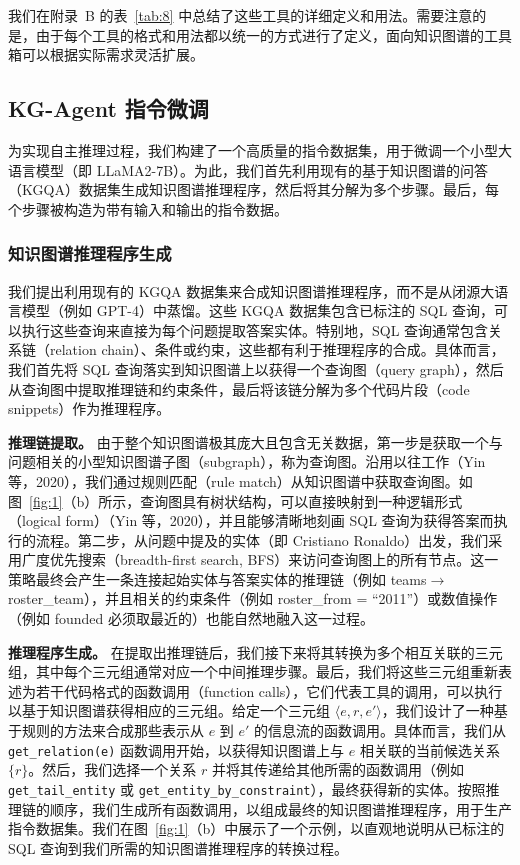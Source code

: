 \documentclass[11pt,UTF8,fontset=fandol]{ctexart}
\begin{document}
我们在附录~B 的表~\ref{tab:8} 中总结了这些工具的详细定义和用法。需要注意的是，由于每个工具的格式和用法都以统一的方式进行了定义，面向知识图谱的工具箱可以根据实际需求灵活扩展。

\subsection{KG-Agent 指令微调}

为实现自主推理过程，我们构建了一个高质量的指令数据集，用于微调一个小型大语言模型（即 LLaMA2-7B）。为此，我们首先利用现有的基于知识图谱的问答（KGQA）数据集生成知识图谱推理程序，然后将其分解为多个步骤。最后，每个步骤被构造为带有输入和输出的指令数据。

\subsubsection{知识图谱推理程序生成}

我们提出利用现有的 KGQA 数据集来合成知识图谱推理程序，而不是从闭源大语言模型（例如 GPT-4）中蒸馏。这些 KGQA 数据集包含已标注的 SQL 查询，可以执行这些查询来直接为每个问题提取答案实体。特别地，SQL 查询通常包含关系链（relation chain）、条件或约束，这些都有利于推理程序的合成。具体而言，我们首先将 SQL 查询落实到知识图谱上以获得一个查询图（query graph），然后从查询图中提取推理链和约束条件，最后将该链分解为多个代码片段（code snippets）作为推理程序。

\textbf{推理链提取。}
由于整个知识图谱极其庞大且包含无关数据，第一步是获取一个与问题相关的小型知识图谱子图（subgraph），称为查询图。沿用以往工作（Yin 等，2020），我们通过规则匹配（rule match）从知识图谱中获取查询图。如图~\ref{fig:1}（b）所示，查询图具有树状结构，可以直接映射到一种逻辑形式（logical form）（Yin 等，2020），并且能够清晰地刻画 SQL 查询为获得答案而执行的流程。第二步，从问题中提及的实体（即 Cristiano Ronaldo）出发，我们采用广度优先搜索（breadth-first search, BFS）来访问查询图上的所有节点。这一策略最终会产生一条连接起始实体与答案实体的推理链（例如 teams$\rightarrow$roster\_team），并且相关的约束条件（例如 roster\_from = ``2011''）或数值操作（例如 founded 必须取最近的）也能自然地融入这一过程。

\textbf{推理程序生成。}
在提取出推理链后，我们接下来将其转换为多个相互关联的三元组，其中每个三元组通常对应一个中间推理步骤。最后，我们将这些三元组重新表述为若干代码格式的函数调用（function calls），它们代表工具的调用，可以执行以基于知识图谱获得相应的三元组。给定一个三元组 $\langle e, r, e' \rangle$，我们设计了一种基于规则的方法来合成那些表示从 $e$ 到 $e'$ 的信息流的函数调用。具体而言，我们从 \texttt{get\_relation(e)} 函数调用开始，以获得知识图谱上与 $e$ 相关联的当前候选关系 $\{r\}$。然后，我们选择一个关系 $r$ 并将其传递给其他所需的函数调用（例如 \texttt{get\_tail\_entity} 或 \texttt{get\_entity\_by\_constraint}），最终获得新的实体。按照推理链的顺序，我们生成所有函数调用，以组成最终的知识图谱推理程序，用于生产指令数据集。我们在图~\ref{fig:1}（b）中展示了一个示例，以直观地说明从已标注的 SQL 查询到我们所需的知识图谱推理程序的转换过程。
\end{document}
